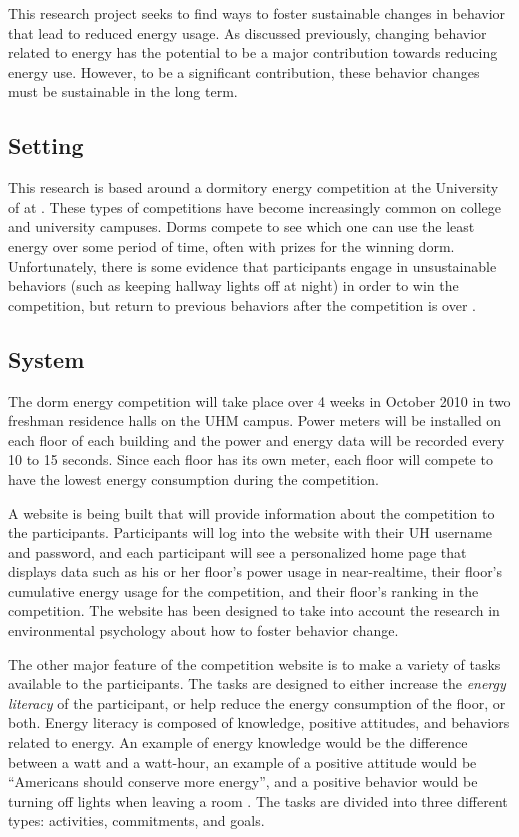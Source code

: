 This research project seeks to find ways to foster sustainable changes in behavior that lead to reduced energy usage. As discussed previously, changing behavior related to energy has the potential to be a major contribution towards reducing energy use. However, to be a significant contribution, these behavior changes must be sustainable in the long term.

\subsection{Setting}
This research is based around a dormitory energy competition at the University of \Hawaii at \Manoa. These types of competitions have become increasingly common on college and university campuses. Dorms compete to see which one can use the least energy over some period of time, often with prizes for the winning dorm. Unfortunately, there is some evidence that participants engage in unsustainable behaviors (such as keeping hallway lights off at night) in order to win the competition, but return to previous behaviors after the competition is over \cite{petersen-dorm-energy-reduction}.

\subsection{System}
The dorm energy competition will take place over 4 weeks in October 2010 in two freshman residence halls on the UHM campus. Power meters will be installed on each floor of each building and the power and energy data will be recorded every 10 to 15 seconds. Since each floor has its own meter, each floor will compete to have the lowest energy consumption during the competition.

A website is being built that will provide information about the competition to the participants. Participants will log into the website with their UH username and password, and each participant will see a personalized home page that displays data such as his or her floor's power usage in near-realtime, their floor's cumulative energy usage for the competition, and their floor's ranking in the competition. The website has been designed to take into account the research in environmental psychology about how to foster behavior change.

The other major feature of the competition website is to make a variety of tasks available to the participants. The tasks are designed to either increase the \emph{energy literacy} of the participant, or help reduce the energy consumption of the floor, or both. Energy literacy is composed of knowledge, positive attitudes, and behaviors related to energy. An example of energy knowledge would be the difference between a watt and a watt-hour, an example of a positive attitude would be ``Americans should conserve more energy'', and a positive behavior would be turning off lights when leaving a room \cite{DeWaters09c}. The tasks are divided into three different types: activities, commitments, and goals. 

